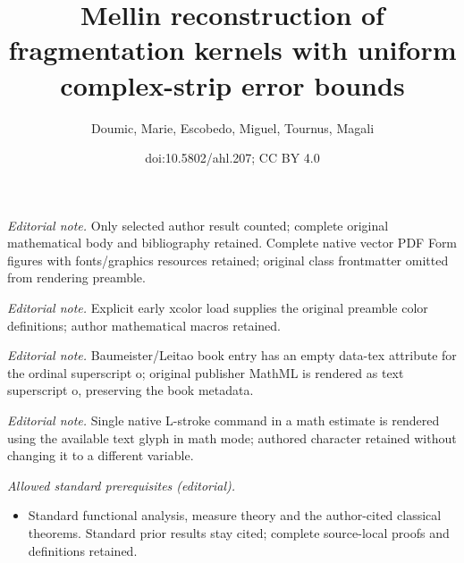 \documentclass[10pt]{amsart}
\title{Mellin reconstruction of fragmentation kernels with uniform complex-strip error bounds}
\author{Doumic, Marie, Escobedo, Miguel, Tournus, Magali}
\date{doi:10.5802/ahl.207; CC BY 4.0}
\theoremstyle{definition}\newtheorem{defi}[theo]{Definition}\newtheorem{rema}[theo]{Remark}\newtheorem{exam}[theo]{Example}\newtheorem{exem}[theo]{Example}\newtheorem{nota}[theo]{Notation}
\begin{document}
\maketitle
\noindent\textit{Editorial note.} Only selected author result counted; complete original mathematical body and bibliography retained. Complete native vector PDF Form figures with fonts/graphics resources retained; original class frontmatter omitted from rendering preamble.\par\medskip
\noindent\textit{Editorial note.} Explicit early xcolor load supplies the original preamble color definitions; author mathematical macros retained.\par\medskip
\noindent\textit{Editorial note.} Baumeister/Leitao book entry has an empty data-tex attribute for the ordinal superscript o; original publisher MathML is rendered as text superscript o, preserving the book metadata.\par\medskip
\noindent\textit{Editorial note.} Single native L-stroke command in a math estimate is rendered using the available text glyph in math mode; authored character retained without changing it to a different variable.\par\medskip
\noindent\textit{Allowed standard prerequisites (editorial).}\begin{itemize}
\item Standard functional analysis, measure theory and the author-cited classical theorems. Standard prior results stay cited; complete source-local proofs and definitions retained.
\end{itemize}\medskip
\end{document}
